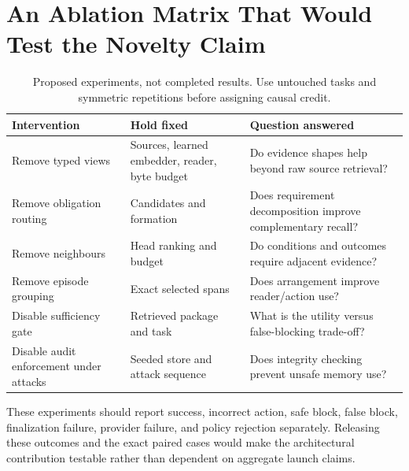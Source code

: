 \documentclass[11pt]{article}
\begin{document}
\section{An Ablation Matrix That Would Test the Novelty Claim}
\begin{table}[!ht]
\centering\small
\begin{tabularx}{\linewidth}{p{.25\linewidth}YY}
\toprule Intervention & Hold fixed & Question answered\\\midrule
Remove typed views & Sources, learned embedder, reader, byte budget & Do evidence shapes help beyond raw source retrieval?\\
Remove obligation routing & Candidates and formation & Does requirement decomposition improve complementary recall?\\
Remove neighbours & Head ranking and budget & Do conditions and outcomes require adjacent evidence?\\
Remove episode grouping & Exact selected spans & Does arrangement improve reader/action use?\\
Disable sufficiency gate & Retrieved package and task & What is the utility versus false-blocking trade-off?\\
Disable audit enforcement under attacks & Seeded store and attack sequence & Does integrity checking prevent unsafe memory use?\\\bottomrule
\end{tabularx}
\caption{Proposed experiments, not completed results. Use untouched tasks and symmetric repetitions before assigning causal credit.}
\end{table}
These experiments should report success, incorrect action, safe block, false block, finalization failure, provider failure, and policy rejection separately. Releasing these outcomes and the exact paired cases would make the architectural contribution testable rather than dependent on aggregate launch claims.
\end{document}
